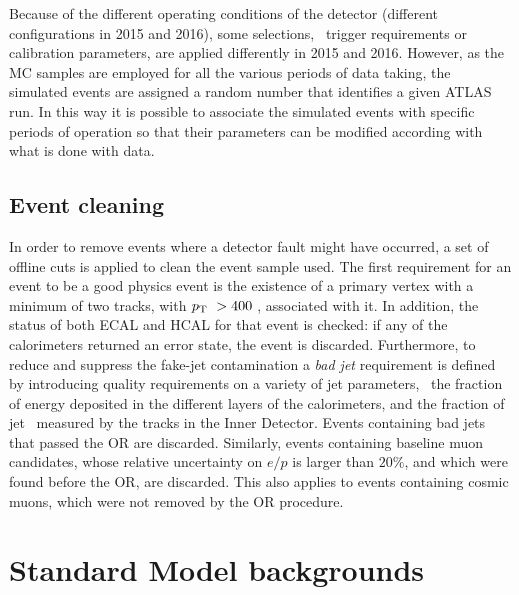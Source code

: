 		Because of the different operating conditions of the detector (different configurations in 2015 and 2016), some selections, \eg\ trigger requirements or calibration parameters, are applied differently in 2015 and 2016. However, as the MC samples are employed for all the various periods of data taking, the simulated events are assigned a random number that identifies a given ATLAS run. In this way it is possible to associate the simulated events with specific periods of operation so that their parameters can be modified according with what is done with data.


		\subsection{Event cleaning}

			In order to remove events where a detector fault might have occurred, a set of offline cuts is applied to clean the event sample used. The first requirement for an event to be a good physics event is the existence of a primary vertex with a minimum of two tracks, with $p_{\mathrm{T}}\ > 400$ \MeV, associated with it. In addition, the status of both \ac{ECAL} and \ac{HCAL} for that event is checked: if any of the calorimeters returned an error state, the event is discarded. Furthermore, to reduce and suppress the fake-jet contamination a \emph{bad jet} requirement is defined by introducing quality requirements on a variety of jet parameters, \eg\ the fraction of energy deposited in the different layers of the calorimeters, and the fraction of jet \pt\ measured by the tracks in the Inner Detector. Events containing bad jets that passed the \ac{OR} are discarded. Similarly, events containing baseline muon candidates, whose relative uncertainty on $e/p$ is larger than $20\%$, and which were found before the \ac{OR}, are discarded. This also applies to events containing cosmic muons, which were not removed by the \ac{OR} procedure.				


	\section{Standard Model backgrounds}
	\label{sec:SMbkg}

